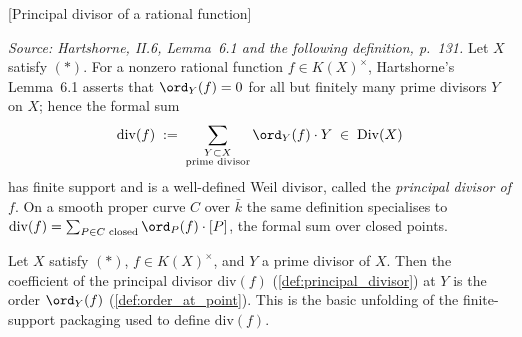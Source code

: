 \begin{definition}
\leanok
[Principal divisor of a rational function]
  \label{def:principal_divisor}
  
  \textit{Source: Hartshorne, II.6, Lemma~6.1 and the following definition,
  p.~131.}
  Let \(X\) satisfy \((*)\). For a nonzero rational function \(f \in K(X)^{\times}\),
  Hartshorne's Lemma~6.1 asserts that \(\ord_Y(f) = 0\) for all but finitely
  many prime divisors \(Y\) on \(X\); hence the formal sum
  \[
    \mathrm{div}(f) \;:=\; \sum_{\substack{Y \subset X \\ \text{prime divisor}}}
    \ord_Y(f) \cdot Y \;\in\; \mathrm{Div}(X)
  \]
  has finite support and is a well-defined Weil divisor, called the
  \emph{principal divisor of \(f\)}. On a smooth proper curve \(C\) over \(\bar k\)
  the same definition specialises to
  \(\mathrm{div}(f) = \sum_{P \in C \text{ closed}} \ord_P(f) \cdot [P]\), the formal
  sum over closed points.
\end{definition}
\begin{lemma}

  \label{lem:principal_apply}
  Let \(X\) satisfy \((*)\), \(f \in K(X)^{\times}\), and \(Y\) a prime divisor
  of \(X\). Then the coefficient of the principal divisor \(\mathrm{div}(f)\)
  (\ref{def:principal_divisor}) at \(Y\) is the order \(\ord_Y(f)\)
  (\ref{def:order_at_point}). This is the basic unfolding of the
  finite-support packaging used to define \(\mathrm{div}(f)\).
\end{lemma}
